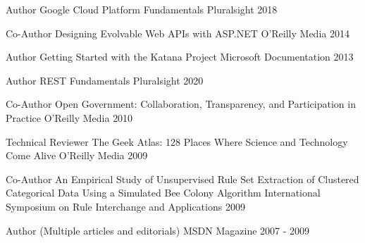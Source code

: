 


\begin{cventries}


\cventry
{Author}
{Google Cloud Platform Fundamentals}
{Pluralsight}
{2018}
{
}


\cventry
{Co-Author}
{Designing Evolvable Web APIs with ASP.NET}
{O'Reilly Media}
{2014}
{
}


\cventry
{Author}
{Getting Started with the Katana Project}
{Microsoft Documentation}
{2013}
{
}


\cventry
{Author}
{REST Fundamentals}
{Pluralsight}
{2020}
{
}


\cventry
{Co-Author}
{Open Government: Collaboration, Transparency, and Participation in Practice}
{O'Reilly Media}
{2010}
{
}


\cventry
{Technical Reviewer}
{The Geek Atlas: 128 Places Where Science and Technology Come Alive}
{O'Reilly Media}
{2009}
{
}


\cventry
{Co-Author}
{An Empirical Study of Unsupervised Rule Set Extraction of Clustered Categorical Data Using a Simulated Bee Colony Algorithm}
{International Symposium on Rule Interchange and Applications}
{2009}
{
}


\cventry
{Author}
{(Multiple articles and editorials)}
{MSDN Magazine}
{2007 - 2009}
{
}


\end{cventries}